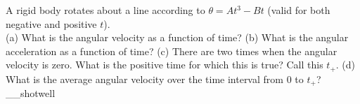 A rigid body rotates about a line according to
$\theta = At^3-Bt$ (valid for both
negative and positive $t$).\\
%
(a) What is the angular velocity as a function of time?\answercheck\hwendpart
%
(b) What is the angular acceleration as a function of time?\answercheck\hwendpart
%
(c) There are two times when the angular velocity is zero. What is the
positive time for which this is true? Call this $t_+$.\answercheck\hwendpart
%
(d) What is the average angular velocity over the time interval
from 0 to $t_+$?__shotwell\answercheck
